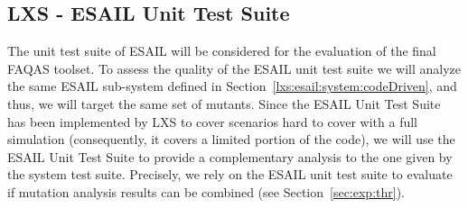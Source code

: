 \subsection{LXS - ESAIL Unit Test Suite}
\label{chapter:caseStudies:LXS:Unit}



The unit test suite of ESAIL will be considered for the evaluation of the final FAQAS toolset. 
To assess the quality of the ESAIL unit test suite we will analyze the same ESAIL sub-system defined in Section~\ref{lxs:esail:system:codeDriven}, and thus, we will target the same set of mutants. Since the ESAIL Unit Test Suite has been implemented by LXS to cover scenarios hard to cover with a full simulation (consequently, it covers a limited portion of the code), we will use the ESAIL Unit Test Suite to provide a complementary analysis to the one given by the system test suite.
Precisely, we rely on the ESAIL unit test suite to evaluate if mutation analysis results can be combined (see Section~\ref{sec:exp:thr}). 






